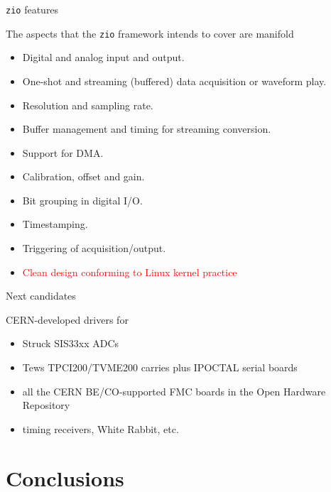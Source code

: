 \documentclass[compress,red]{beamer}
\begin{document}
\begin{frame}{\texttt{zio} features}

The aspects that the \texttt{zio} framework intends to cover are
manifold
\begin{itemize} \small
\pause\item Digital and analog input and output.
\pause\item One-shot and streaming (buffered) data acquisition or waveform play.
\pause\item Resolution and sampling rate.
\pause\item Buffer management and timing for streaming conversion.
\pause\item Support for DMA.
\pause\item Calibration, offset and gain.
\pause\item Bit grouping in digital I/O.
\pause\item Timestamping.
\pause\item Triggering of acquisition/output.
\pause\item \textcolor{red}{Clean design conforming to Linux kernel practice}
\end{itemize}
\end{frame}

\begin{frame}{Next candidates}

CERN-developed drivers for
\begin{itemize}
\pause
\item Struck SIS33xx ADCs
\pause
\item Tews TPCI200/TVME200 carries plus IPOCTAL serial boards
\pause
\item all the CERN BE/CO-supported FMC boards in the Open Hardware Repository
\pause
\item timing receivers, White Rabbit, etc.
\end{itemize}
\end{frame}

\section{Conclusions}
\end{document}
